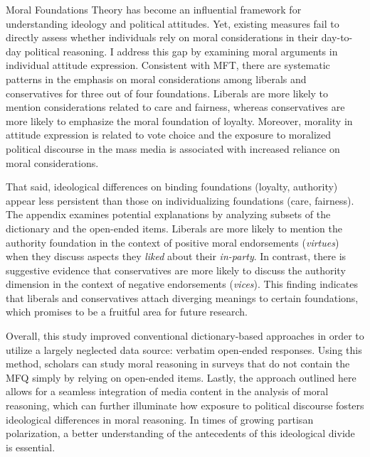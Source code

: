 \documentclass[12pt]{article}
\begin{document}
Moral Foundations Theory has become an influential framework for understanding ideology and political attitudes. Yet, existing measures fail to directly assess whether individuals rely on moral considerations in their day-to-day political reasoning. I address this gap by examining moral arguments in individual attitude expression. Consistent with MFT, there are systematic patterns in the emphasis on moral considerations among liberals and conservatives for three out of four foundations. Liberals are more likely to mention considerations related to care and fairness, whereas conservatives are more likely to emphasize the moral foundation of loyalty. Moreover, morality in attitude expression is related to vote choice and the exposure to moralized political discourse in the mass media is associated with increased reliance on moral considerations.

That said, ideological differences on binding foundations (loyalty, authority) appear less persistent than those on individualizing foundations (care, fairness). The appendix examines potential explanations by analyzing subsets of the dictionary and the open-ended items. Liberals are more likely to mention the authority foundation in the context of positive moral endorsements (\textit{virtues}) when they discuss aspects they \textit{liked} about their \textit{in-party}. In contrast, there is suggestive evidence that conservatives are more likely to discuss the authority dimension in the context of negative endorsements (\textit{vices}). This finding indicates that liberals and conservatives attach diverging meanings to certain foundations, which promises to be a fruitful area for future research.

Overall, this study improved conventional dictionary-based approaches in order to utilize a largely neglected data source: verbatim open-ended responses. Using this method, scholars can study moral reasoning in surveys that do not contain the MFQ simply by relying on open-ended items. Lastly, the approach outlined here allows for a seamless integration of media content in the analysis of moral reasoning, which can further illuminate how exposure to political discourse fosters ideological differences in moral reasoning. In times of growing partisan polarization, a better understanding of the antecedents of this ideological divide is essential.
\end{document}
